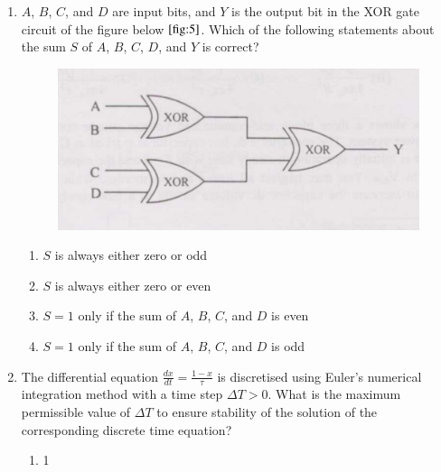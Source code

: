 \documentclass[journal]{IEEEtran}
\numberwithin{equation}{enumi}
\numberwithin{figure}{enumi}
\begin{document}
\begin{enumerate}
\begin{figure}[!ht]
    \caption{}
    \label{fig:4}
\end{figure}
\begin{multicols}{4}
\begin{enumerate}
    \item 46\%
    \item 55\%
    \item 63\%
    \item 92\%
\end{enumerate}
\end{multicols}
\bigskip
\item $A$, $B$, $C$, and $D$ are input bits, and $Y$ is the output bit in the XOR gate circuit of the figure below $\ref{fig:5}$. Which of the following statements about the sum $S$ of $A$, $B$, $C$, $D$, and $Y$ is correct?
\begin{figure}[!ht]
    \centering
    \includegraphics[width=\linewidth]{figs/5.png}
    \caption{}
    \label{fig:5}
\end{figure}
\begin{enumerate}
    \item $S$ is always either zero or odd
    \item $S$ is always either zero or even
    \item $S = 1$ only if the sum of $A$, $B$, $C$, and $D$ is even
    \item $S = 1$ only if the sum of $A$, $B$, $C$, and $D$ is odd
\end{enumerate}
    \bigskip
    \item The differential equation $\frac{dx}{dt} = \frac{1 - x}{\tau}$ is discretised using Euler's numerical integration method with a time step $\Delta T > 0$. What is the maximum permissible value of $\Delta T$ to ensure stability of the solution of the corresponding discrete time equation?
    \begin{multicols}{4}
    \begin{enumerate}
        \item 1

\end{enumerate}
\end{multicols}
\end{enumerate}
\end{document}
